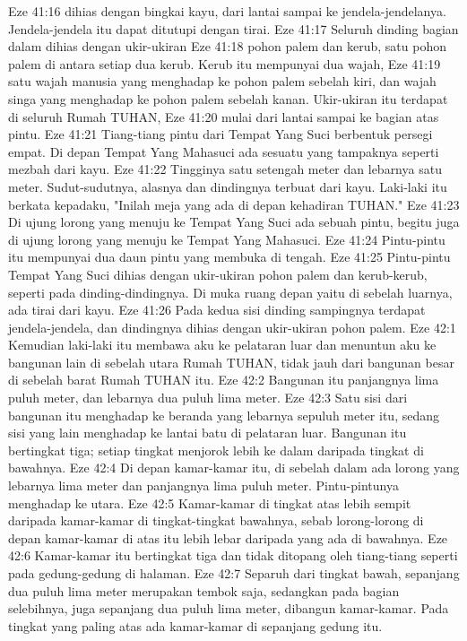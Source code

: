 Eze 41:16  dihias dengan bingkai kayu, dari lantai sampai ke jendela-jendelanya. Jendela-jendela itu dapat ditutupi dengan tirai.
Eze 41:17  Seluruh dinding bagian dalam dihias dengan ukir-ukiran
Eze 41:18  pohon palem dan kerub, satu pohon palem di antara setiap dua kerub. Kerub itu mempunyai dua wajah,
Eze 41:19  satu wajah manusia yang menghadap ke pohon palem sebelah kiri, dan wajah singa yang menghadap ke pohon palem sebelah kanan. Ukir-ukiran itu terdapat di seluruh Rumah TUHAN,
Eze 41:20  mulai dari lantai sampai ke bagian atas pintu.
Eze 41:21  Tiang-tiang pintu dari Tempat Yang Suci berbentuk persegi empat. Di depan Tempat Yang Mahasuci ada sesuatu yang tampaknya seperti mezbah dari kayu.
Eze 41:22  Tingginya satu setengah meter dan lebarnya satu meter. Sudut-sudutnya, alasnya dan dindingnya terbuat dari kayu. Laki-laki itu berkata kepadaku, "Inilah meja yang ada di depan kehadiran TUHAN."
Eze 41:23  Di ujung lorong yang menuju ke Tempat Yang Suci ada sebuah pintu, begitu juga di ujung lorong yang menuju ke Tempat Yang Mahasuci.
Eze 41:24  Pintu-pintu itu mempunyai dua daun pintu yang membuka di tengah.
Eze 41:25  Pintu-pintu Tempat Yang Suci dihias dengan ukir-ukiran pohon palem dan kerub-kerub, seperti pada dinding-dindingnya. Di muka ruang depan yaitu di sebelah luarnya, ada tirai dari kayu.
Eze 41:26  Pada kedua sisi dinding sampingnya terdapat jendela-jendela, dan dindingnya dihias dengan ukir-ukiran pohon palem.
Eze 42:1  Kemudian laki-laki itu membawa aku ke pelataran luar dan menuntun aku ke bangunan lain di sebelah utara Rumah TUHAN, tidak jauh dari bangunan besar di sebelah barat Rumah TUHAN itu.
Eze 42:2  Bangunan itu panjangnya lima puluh meter, dan lebarnya dua puluh lima meter.
Eze 42:3  Satu sisi dari bangunan itu menghadap ke beranda yang lebarnya sepuluh meter itu, sedang sisi yang lain menghadap ke lantai batu di pelataran luar. Bangunan itu bertingkat tiga; setiap tingkat menjorok lebih ke dalam daripada tingkat di bawahnya.
Eze 42:4  Di depan kamar-kamar itu, di sebelah dalam ada lorong yang lebarnya lima meter dan panjangnya lima puluh meter. Pintu-pintunya menghadap ke utara.
Eze 42:5  Kamar-kamar di tingkat atas lebih sempit daripada kamar-kamar di tingkat-tingkat bawahnya, sebab lorong-lorong di depan kamar-kamar di atas itu lebih lebar daripada yang ada di bawahnya.
Eze 42:6  Kamar-kamar itu bertingkat tiga dan tidak ditopang oleh tiang-tiang seperti pada gedung-gedung di halaman.
Eze 42:7  Separuh dari tingkat bawah, sepanjang dua puluh lima meter merupakan tembok saja, sedangkan pada bagian selebihnya, juga sepanjang dua puluh lima meter, dibangun kamar-kamar. Pada tingkat yang paling atas ada kamar-kamar di sepanjang gedung itu.
